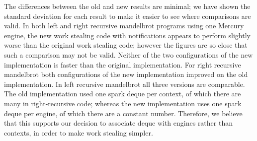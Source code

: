 The differences between the old and new results are minimal;
we have shown the standard deviation for each result to make it easier to
see where comparisons are valid.
In both left and right recursive mandelbrot programs using one Mercury
engine,
the new work stealing code with notifications appears to perform slightly worse than
the original work stealing code;
however the figures are so close that such a comparison may not be
valid.
Neither of the two configurations of the new implementation is faster than
the original implementation.
For right recursive mandelbrot both configurations of the new
implementation improved on
the old implementation.
In left recursive mandelbrot all three versions are comparable.
The old implementation used one spark deque per context, of which there are
many in right-recursive code;
whereas the new implementation uses one spark deque per engine, of which
there are a constant number.
Therefore,
we believe that this supports our decision to associate deque with engines
rather than contexts, in order to make work stealing simpler.



